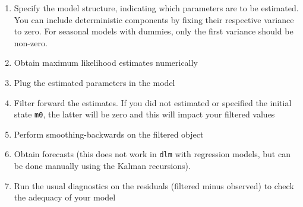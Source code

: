 \documentclass[]{book}
\providecommand{\tightlist}{%
  \setlength{\itemsep}{0pt}\setlength{\parskip}{0pt}}
\begin{document}
\begin{enumerate}
\def\labelenumi{\arabic{enumi}.}
\tightlist
\item
  Specify the model structure, indicating which parameters are to be
  estimated. You can include deterministic components by fixing their
  respective variance to zero. For seasonal models with dummies, only
  the first variance should be non-zero.
\item
  Obtain maximum likelihood estimates numerically
\item
  Plug the estimated parameters in the model
\item
  Filter forward the estimates. If you did not estimated or specified
  the initial state \texttt{m0}, the latter will be zero and this will
  impact your filtered values
\item
  Perform smoothing-backwards on the filtered object
\item
  Obtain forecasts (this does not work in \texttt{dlm} with regression
  models, but can be done manually using the Kalman recursions).
\item
  Run the usual diagnostics on the residuals (filtered minus observed)
  to check the adequacy of your model
\end{enumerate}
\end{document}
